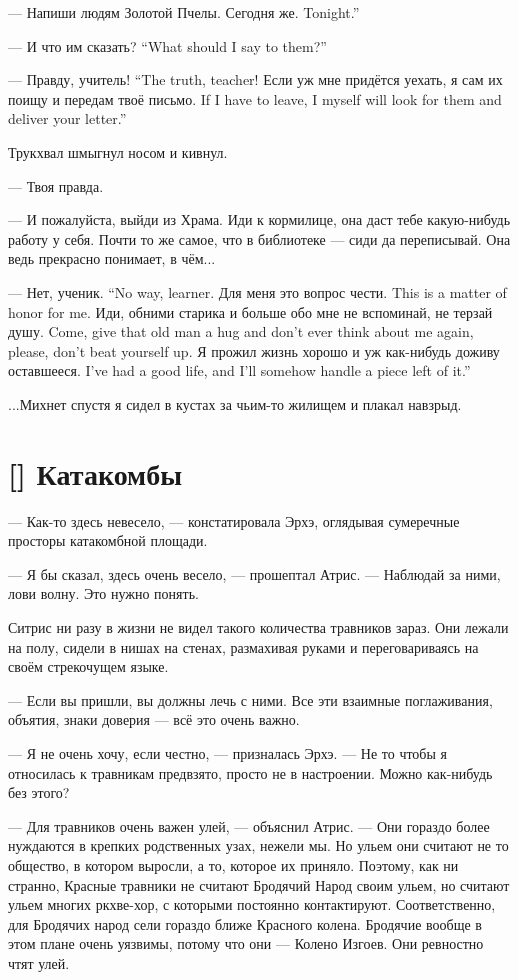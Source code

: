 --- Напиши людям Золотой Пчелы.
{Сегодня же.}
{Tonight.''}

{--- И что им сказать?}
{``What should I say to them?''}

{--- Правду, учитель!}
{``The truth, teacher!}
{Если уж мне придётся уехать, я сам их поищу и передам твоё письмо.}
{If I have to leave, I myself will look for them and deliver your letter.''}

Трукхвал шмыгнул носом и кивнул.

--- Твоя правда.

--- И пожалуйста, выйди из Храма.
Иди к кормилице, она даст тебе какую-нибудь работу у себя.
Почти то же самое, что в библиотеке --- сиди да переписывай.
Она ведь прекрасно понимает, в чём...

{--- Нет, ученик.}
{``No way, learner.}
{Для меня это вопрос чести.}
{This is a matter of honor for me.}
{Иди, обними старика и больше обо мне не вспоминай, не терзай душу.}
{Come, give that old man a hug and don't ever think about me again, please, don't beat yourself up.}
{Я прожил жизнь хорошо и уж как-нибудь доживу оставшееся.}
{I've had a good life, and I'll somehow handle a piece left of it.''}

...Михнет спустя я сидел в кустах за чьим-то жилищем и плакал навзрыд.

\section{[] Катакомбы}

--- Как-то здесь невесело, --- констатировала Эрхэ, оглядывая сумеречные просторы катакомбной площади.

--- Я бы сказал, здесь очень весело, --- прошептал Атрис.
--- Наблюдай за ними, лови волну.
Это нужно понять.

Ситрис ни разу в жизни не видел такого количества травников зараз.
Они лежали на полу, сидели в нишах на стенах, размахивая руками и переговариваясь на своём стрекочущем языке.

\textspace

--- Если вы пришли, вы должны лечь с ними.
Все эти взаимные поглаживания, объятия, знаки доверия --- всё это очень важно.

--- Я не очень хочу, если честно, --- призналась Эрхэ.
--- Не то чтобы я относилась к травникам предвзято, просто не в настроении.
Можно как-нибудь без этого?

--- Для травников очень важен улей, --- объяснил Атрис.
--- Они гораздо более нуждаются в крепких родственных узах, нежели мы.
Но ульем они считают не то общество, в котором выросли, а то, которое их приняло.
Поэтому, как ни странно, Красные травники не считают Бродячий Народ своим ульем, но считают ульем многих ркхве-хор, с которыми постоянно контактируют.
Соответственно, для Бродячих народ сели гораздо ближе Красного колена.
Бродячие вообще в этом плане очень уязвимы, потому что они --- Колено Изгоев.
Они ревностно чтят улей.

